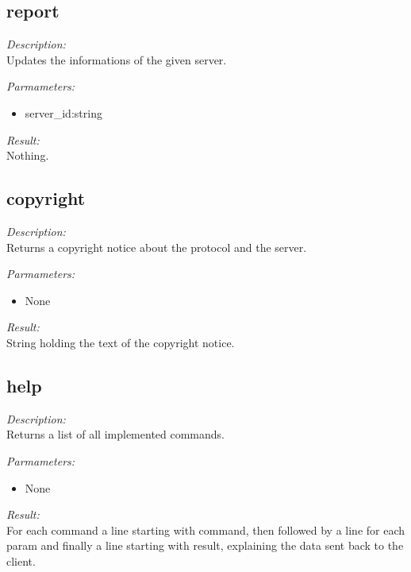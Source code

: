 \subsection{report}

\begin{description}
\item {\it Description:}\\
Updates the informations of the given server.
\item {\it Parmameters:}
\begin{itemize}
\item server\_id:string
\end{itemize}
\item {\it Result:}\\
Nothing.
\end{description}

\subsection{copyright}

\begin{description}
\item {\it Description:}\\
Returns a copyright notice about the protocol and the server.
\item {\it Parmameters:}
\begin{itemize}
\item None
\end{itemize}
\item {\it Result:}\\
String holding the text of the copyright notice.
\end{description}

\subsection{help}

\begin{description}
\item {\it Description:}\\
Returns a list of all implemented commands.
\item {\it Parmameters:}
\begin{itemize}
\item None
\end{itemize}
\item {\it Result:}\\
For each command a line starting with command, then followed by a line for each param and finally a line starting with result, explaining the data sent back to the client.
\end{description}

